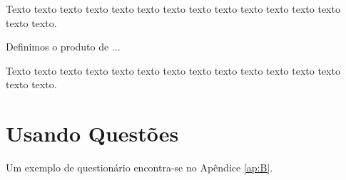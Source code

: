 Texto texto texto texto texto texto texto texto texto texto texto texto texto texto texto.


\begin{xdefinicao}
	Definimos o produto de ...
\end{xdefinicao}

Texto texto texto texto texto texto texto texto texto texto texto texto texto texto texto.

\section{Usando Questões} 

Um exemplo de questionário encontra-se no Apêndice \ref{ap:B}.


